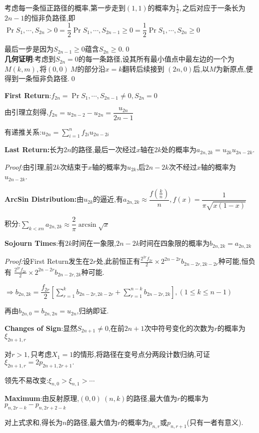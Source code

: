 考虑每一条恒正路径的概率,第一步走到$ (1,1)$的概率为$ \frac{1}{2},$之后对应于一条长为$ 2n-1$的恒非负路径,即
$ \Pr{S_1,\cdots ,S_{2n}>0}=\dfrac{1}{2}\Pr{S_1,\cdots ,S_{2n-1}\ge 0} = \dfrac{1}{2}\Pr{S_1,\cdots ,S_{2n}\ge 0}$

最后一步是因为$ S_{2n-1}\ge 0$蕴含$ S_{2n}\ge 0. $\qed
\\

\textbf{几何证明}:考虑到$ S_{2n}=0$的每一条路径,设其所有最小值点中最左边的一个为$ M(k,m),$将$ (0,0)~M$的部分沿$ x=k$翻转后续接到
$ (2n,0)$后,以$ M$为新原点,便得到一条恒非负路径.\qed
\vspace{0.6cm}

  \textbf{First Return}:$ f_{2n} = \Pr{S_1,\cdots ,S_{2n-1}\neq 0, S_{2n} = 0}$

  由引理立刻得,$ f_{2n} = u_{2n-2}-u_{2n} = \dfrac{u_{2n}}{2n-1}$

  有递推关系:$ u_{2n}=\sum_{i=1}^n{f_{2i}u_{2n-2i}}$
  \vspace{0.6cm}

  \textbf{Last Return:}长为$ 2n$的路径,最后一次经过$ x$轴在$ 2k$处的概率为$ a_{2n,2k} = u_{2k}u_{2n-2k}$.

  \textit{Proof:}由引理,前$ 2k$次结束于$ x$轴的概率为$ u_{2k}$,后$ 2n-2k$次不经过$ x$轴的概率为$ u_{2n-2k}$.

  \textbf{ArcSin Distribution:}由$ u_{2k}$的逼近,有$ a_{2n,2k}\approx \dfrac{f(\frac{k}{n})}{n},f(x)=\dfrac{1}{\pi\sqrt{x(1-x)}}$

  积分:$\sum_{k<xn}a_{2n,2k}\approx \dfrac{2}{\pi}\arcsin{\sqrt{x}}$
\vspace{0.6cm}

\textbf{Sojourn Times}:有$ 2k$时间在一象限,$ 2n-2k$时间在四象限的概率为$ b_{2n,2k} = a_{2n,2k}$

\textit{Proof:}设First Return发生在$ 2r$处,此前恒正有$ \frac{2^{2r}f_{2r}}{2} \times 2^{2n-2r}b_{2n-2r,2k-2r}$种可能,恒负有
$ \frac{2^{2r}f_{2r}}{2}\times 2^{2n-2r}b_{2n-2r,2k}$种可能.

$ \Rightarrow b_{2n,2k} = \dfrac{f_{2r}}{2}[\sum_{r=1}^k{b_{2n-2r,2k-2r}} + \sum_{r=1}^{n-k}{b_{2n-2r,2k}}],(1\le k \le n-1)$

再由$ b_{2n,0}=b_{2n,2n}=u_{2n}$,归纳即证.
\vspace{0.6cm}

\textbf{Changes of Sign}:显然$ S_{2n+1}\neq 0$,在前$ 2n+1$次中符号变化的次数为$ r$的概率为$ \xi_{2n+1,r} $

对$ r>1,$只考虑$ X_1=1$的情形,将路径在变号点分两段计数归纳,可证$ \xi_{2n+1,r}=2p_{2n+1,2r+1}.$

领先不易改变:$ \xi_{n,0}>\xi_{n,1}>\cdots $
\vspace{0.6cm}

\textbf{Maximum}:由反射原理,$ (0,0)~(n,k)$的路径,最大值为$ r$的概率为$ p_{n,2r-k}-p_{n,2r+2-k}$

对上式求和,得长为$ n$的路径,最大值为$ r$的概率为$ p_{n,r}或p_{n,r+1}$(只有一者有意义).

